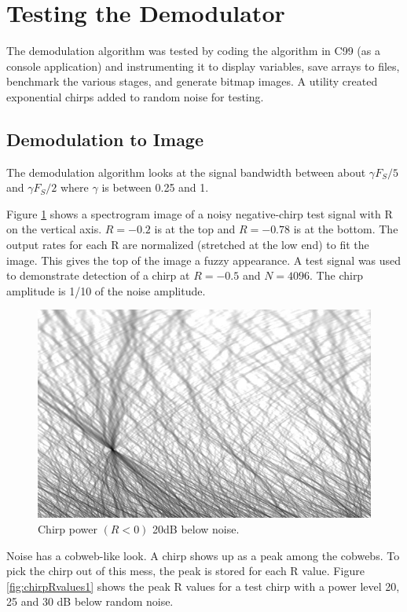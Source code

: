 \section{Testing the Demodulator}

The demodulation algorithm was tested by coding the algorithm in C99
(as a console application) and instrumenting it to display variables,
save arrays to files, benchmark the various stages, and generate bitmap images.
A utility created exponential chirps added to random noise for testing.

\subsection{Demodulation to Image}

The demodulation algorithm looks at the signal bandwidth between about
$\gamma F_S/5$ and $\gamma F_S/2$ where $\gamma$ is between 0.25 and 1.

Figure \ref{fig:chirpTest1} shows a spectrogram image of a noisy
negative-chirp test signal with R on the vertical axis.
$R=-0.2$ is at the top and $R=-0.78$ is at the bottom.
The output rates for each R are normalized (stretched at the low end)
to fit the image.
This gives the top of the image a fuzzy appearance.
A test signal was used to demonstrate detection of a chirp at
$R=-0.5$ and $N=4096$.
The chirp amplitude is 1/10 of the noise amplitude.
\begin{figure}
  \includegraphics[width=\linewidth]{../source/chirp42m.jpg}
  \caption{Chirp power $(R<0)$ 20dB below noise.}
  \label{fig:chirpTest1}
\end{figure}

Noise has a cobweb-like look. A chirp shows up as a peak among the cobwebs.
To pick the chirp out of this mess, the peak is stored for each R value.
Figure \ref{fig:chirpRvalues1} shows the peak R values for a test chirp with a
power level 20, 25 and 30 dB below random noise.

